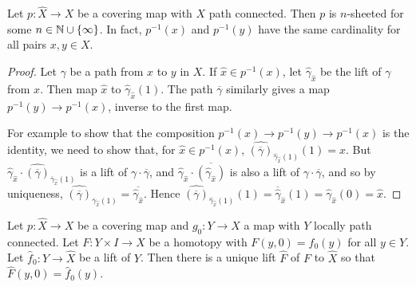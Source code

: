 \documentclass[10pt,a4paper]{article}
\begin{document}
\begin{corollary}
Let $p:\hat{X}\to X$ be a covering map with $X$ path connected. Then $p$ is $n$-sheeted for some $n \in \mathbb{N}\cup \{\infty\}$. In fact, $p^{-1}(x)$ and $p^{-1}(y)$ have the same cardinality for all pairs $x,y \in X$.
\end{corollary}
\begin{proof}
Let $\gamma$ be a path from $x$ to $y$ in $X$. If $\hat{x} \in p^{-1}(x)$, let $\hat{\gamma}_{\hat{x}}$ be the lift of $\gamma$ from $x$. Then map $\hat{x}$ to $\hat{\gamma}_{\hat{x}}(1)$. The path $\overline{\gamma}$ similarly gives a map $p^{-1}(y)\to p^{-1}(x)$, inverse to the first map.

For example to show that the composition $p^{-1}(x)\to p^{-1}(y) \to p^{-1}(x)$ is the identity, we need to show that, for $\hat{x} \in p^{-1}(x)$, $\hat{(\overline{\gamma})}_{\hat{\gamma}_{\hat{x}}(1)}(1) = \hat{x}$. But $\hat{\gamma}_{\hat{x}}\cdot \hat{(\overline{\gamma})}_{\overline{\gamma}_{\hat{x}} (1)}$ is a lift of $\gamma\cdot \overline{\gamma}$, and $\hat{\gamma}_{\hat{x}}\cdot \overline{(\hat{\gamma}_{\hat{x}})}$ is also a lift of $\gamma\cdot \overline{\gamma}$, and so by uniqueness, $\hat{(\overline{\gamma})}_{\overline{\gamma}_{\hat{x}}(1)} = \overline{\hat{\gamma}_{\hat{x}}}$. Hence $\hat{(\overline{\gamma})}_{\hat{\gamma}_{\hat{x}}(1)}(1) = \overline{\hat{\gamma}}_{\hat{x}}(1) = \hat{\gamma}_{\hat{x}}(0) = \hat{x}$.
\end{proof}
\begin{lemma}
Let $p:\hat{X}\to X$ be a covering map and $g_0:Y\to X$ a map with $Y$ locally path connected. Let $F:Y\times I \to X$ be a homotopy with $F(y,0) = f_0(y)$ for all $y \in Y$. Let $\hat{f}_0:Y \to \hat{X}$ be a lift of $Y$. Then there is a unique lift $\hat{F}$ of $F$ to $\hat{X}$ so that $\hat{F}(y,0) = \hat{f}_0(y)$.
\end{lemma}
\end{document}
